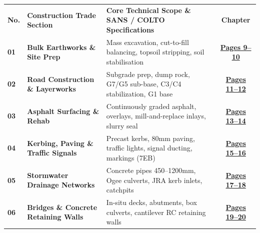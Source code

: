 \documentclass[a4paper,11pt]{article}
\begin{document}
\renewcommand{\arraystretch}{1.18}
\begin{tabularx}{\textwidth}{@{}l p{4.2cm} X c@{}}
\rowcolor{mhnavy}
{\color{white}\bfseries\fontsize{7.8pt}{9.2pt}\selectfont No.} & {\color{white}\bfseries\fontsize{7.8pt}{9.2pt}\selectfont Construction Trade Section} & {\color{white}\bfseries\fontsize{7.8pt}{9.2pt}\selectfont Core Technical Scope \& SANS / COLTO Specifications} & {\color{white}\bfseries\fontsize{7.8pt}{9.2pt}\selectfont Chapter} \\
\rowcolor{mhbluelight}
\fontsize{7.5pt}{9.0pt}\selectfont\bfseries 01 & \fontsize{7.5pt}{9.0pt}\selectfont\bfseries Bulk Earthworks \& Site Prep & \fontsize{7.5pt}{9.0pt}\selectfont Mass excavation, cut-to-fill balancing, topsoil stripping, soil stabilisation & \fontsize{7.5pt}{9.0pt}\selectfont\hyperlink{sec:earthworks}{\bfseries\color{mhblue}Pages 9--10} \\
\fontsize{7.5pt}{9.0pt}\selectfont\bfseries 02 & \fontsize{7.5pt}{9.0pt}\selectfont\bfseries Road Construction \& Layerworks & \fontsize{7.5pt}{9.0pt}\selectfont Subgrade prep, dump rock, G7/G5 sub-base, C3/C4 stabilization, G1 base & \fontsize{7.5pt}{9.0pt}\selectfont\hyperlink{sec:roads}{\bfseries\color{mhblue}Pages 11--12} \\
\rowcolor{mhbluelight}
\fontsize{7.5pt}{9.0pt}\selectfont\bfseries 03 & \fontsize{7.5pt}{9.0pt}\selectfont\bfseries Asphalt Surfacing \& Rehab & \fontsize{7.5pt}{9.0pt}\selectfont Continuously graded asphalt, overlays, mill-and-replace inlays, slurry seal & \fontsize{7.5pt}{9.0pt}\selectfont\hyperlink{sec:asphalt}{\bfseries\color{mhblue}Pages 13--14} \\
\fontsize{7.5pt}{9.0pt}\selectfont\bfseries 04 & \fontsize{7.5pt}{9.0pt}\selectfont\bfseries Kerbing, Paving \& Traffic Signals & \fontsize{7.5pt}{9.0pt}\selectfont Precast kerbs, 80mm paving, traffic lights, signal ducting, markings (7EB) & \fontsize{7.5pt}{9.0pt}\selectfont\hyperlink{sec:kerbing}{\bfseries\color{mhblue}Pages 15--16} \\
\rowcolor{mhbluelight}
\fontsize{7.5pt}{9.0pt}\selectfont\bfseries 05 & \fontsize{7.5pt}{9.0pt}\selectfont\bfseries Stormwater Drainage Networks & \fontsize{7.5pt}{9.0pt}\selectfont Concrete pipes 450--1200mm, Ogee culverts, JRA kerb inlets, catchpits & \fontsize{7.5pt}{9.0pt}\selectfont\hyperlink{sec:stormwater}{\bfseries\color{mhblue}Pages 17--18} \\
\fontsize{7.5pt}{9.0pt}\selectfont\bfseries 06 & \fontsize{7.5pt}{9.0pt}\selectfont\bfseries Bridges \& Concrete Retaining Walls & \fontsize{7.5pt}{9.0pt}\selectfont In-situ decks, abutments, box culverts, cantilever RC retaining walls & \fontsize{7.5pt}{9.0pt}\selectfont\hyperlink{sec:bridges}{\bfseries\color{mhblue}Pages 19--20} \\

\end{tabularx}
\end{document}
